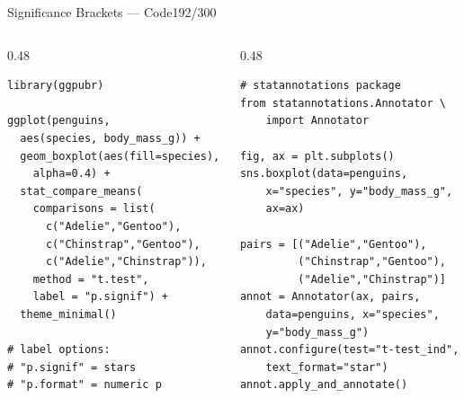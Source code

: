 \documentclass[10pt]{beamer}
\newcommand{\smark}[1]{\hfill{\scriptsize\color{codegray}#1}}
\begin{document}
\begin{frame}[fragile]{Significance Brackets --- Code}\smark{192/300}
\begin{columns}[T]
\begin{column}{0.48\textwidth}
\begin{lstlisting}[style=Rstyle]
library(ggpubr)

ggplot(penguins,
  aes(species, body_mass_g)) +
  geom_boxplot(aes(fill=species),
    alpha=0.4) +
  stat_compare_means(
    comparisons = list(
      c("Adelie","Gentoo"),
      c("Chinstrap","Gentoo"),
      c("Adelie","Chinstrap")),
    method = "t.test",
    label = "p.signif") +
  theme_minimal()

# label options:
# "p.signif" = stars
# "p.format" = numeric p
\end{lstlisting}
\end{column}
\begin{column}{0.48\textwidth}
\begin{lstlisting}[style=Pystyle]
# statannotations package
from statannotations.Annotator \
    import Annotator

fig, ax = plt.subplots()
sns.boxplot(data=penguins,
    x="species", y="body_mass_g",
    ax=ax)

pairs = [("Adelie","Gentoo"),
         ("Chinstrap","Gentoo"),
         ("Adelie","Chinstrap")]
annot = Annotator(ax, pairs,
    data=penguins, x="species",
    y="body_mass_g")
annot.configure(test="t-test_ind",
    text_format="star")
annot.apply_and_annotate()
\end{lstlisting}
\end{column}
\end{columns}
\end{frame}
\end{document}

